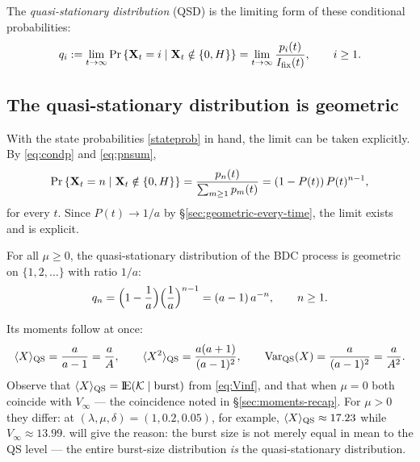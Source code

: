 The \emph{quasi-stationary distribution} (QSD) is the limiting form of these
conditional probabilities:
\begin{equation}
q_i:=\lim_{t\to\infty}{\text{Pr}\left\{{{\bf X}_t}=i\mid{{\bf X}_t}\notin\{0,H\}\right\}}
=\lim_{t\to\infty}\frac{p_i(t)}{I_{\mathrm{fix}}(t)},\qquad i\ge1.
\end{equation}

\subsection{The quasi-stationary distribution is geometric}

With the state probabilities \eqref{stateprob} in hand, the limit can be
taken explicitly. By \eqref{eq:condp} and \eqref{eq:pnsum},
$$
{\text{Pr}\left\{{{\bf X}_t}=n\mid{{\bf X}_t}\notin\{0,H\}\right\}}
=\frac{p_n(t)}{\sum_{m\ge1}p_m(t)}
=\left(1-P(t)\right) P(t)^{n-1},
$$
for every $t$. Since $P(t)\to1/a$ by \S\ref{sec:geometric-every-time}, the
limit exists and is explicit.

\begin{theorem}
\label{thm:qsd}
For all $\mu\ge0$, the quasi-stationary distribution of the BDC process is
geometric on $\{1,2,\ldots\}$ with ratio $1/a$:
\begin{equation}
q_n=\Bigl(1-\frac{1}{a}\Bigr)\Bigl(\frac{1}{a}\Bigr)^{n-1}
=(a-1)\,a^{-n},\qquad n\ge1.
\label{eq:qsd}
\end{equation}
\end{theorem}

Its moments follow at once:
\begin{equation}
\langle X\rangle_{\rm QS}=\frac{a}{a-1}=\frac{a}{A},
\qquad
\langle X^2\rangle_{\rm QS}=\frac{a(a+1)}{(a-1)^2},
\qquad
\mathrm{Var}_{\rm QS}(X)=\frac{a}{(a-1)^2}=\frac{a}{A^2}.
\label{eq:QSmoments}
\end{equation}
Observe that $\langle X\rangle_{\rm QS}={\rm I}\!{\rm E}(\mathcal{K}\mid\text{burst})$ from
\eqref{eq:Vinf}, and that when $\mu=0$ both coincide with $V_\infty$ ---
the coincidence noted in \S\ref{sec:moments-recap}. For $\mu>0$ they differ:
at $(\lambda,\mu,\delta)=(1,0.2,0.05)$, for example,
$\langle X\rangle_{\rm QS}\approx17.23$ while $V_\infty\approx13.99$.
 will give the reason: the burst size is
not merely equal in mean to the QS level --- the entire burst-size
distribution \emph{is} the quasi-stationary distribution.

